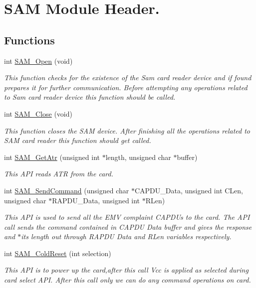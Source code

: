 \hypertarget{group__F}{\section{S\+A\+M Module Header.}
\label{group__F}
}
\subsection*{Functions}
\begin{DoxyCompactItemize}
\item 
int \hyperlink{group__F_gad43449de19bf2fb1d6d4f9e0944840bf}{S\+A\+M\+\_\+\+Open} (void)
\begin{DoxyCompactList}\small\item\em This function checks for the existence of the Sam card reader device and if found prepares it for further communication. Before attempting any operations related to Sam card reader device this function should be called. \end{DoxyCompactList}\item 
int \hyperlink{group__F_ga48040ba823a58f324ac38a6bb21376e2}{S\+A\+M\+\_\+\+Close} (void)
\begin{DoxyCompactList}\small\item\em This function closes the S\+A\+M device. After finishing all the operations related to S\+A\+M card reader this function should get called. \end{DoxyCompactList}\item 
int \hyperlink{group__F_ga66804014e17c75985005870456133fd9}{S\+A\+M\+\_\+\+Get\+Atr} (unsigned int $\ast$length, unsigned char $\ast$buffer)
\begin{DoxyCompactList}\small\item\em This A\+P\+I reads A\+T\+R from the card. \end{DoxyCompactList}\item 
int \hyperlink{group__F_gaa53c6aaf4884c46519194ee2ea43971b}{S\+A\+M\+\_\+\+Send\+Command} (unsigned char $\ast$C\+A\+P\+D\+U\+\_\+\+Data, unsigned int C\+Len, unsigned char $\ast$R\+A\+P\+D\+U\+\_\+\+Data, unsigned int $\ast$R\+Len)
\begin{DoxyCompactList}\small\item\em This A\+P\+I is used to send all the E\+M\+V complaint C\+A\+P\+D\+Us to the card. The A\+P\+I call sends the command contained in C\+A\+P\+D\+U Data buffer and gives the response and $\ast$its length out through R\+A\+P\+D\+U Data and R\+Len variables respectively. \end{DoxyCompactList}\item 
int \hyperlink{group__F_ga55ebe18119baa9aafe31e61f8a38605c}{S\+A\+M\+\_\+\+Cold\+Reset} (int selection)
\begin{DoxyCompactList}\small\item\em This A\+P\+I is to power up the card,after this call Vcc is applied as selected during card select A\+P\+I. After this call only we can do any command operations on card. \end{DoxyCompactList}\end{DoxyCompactItemize}


